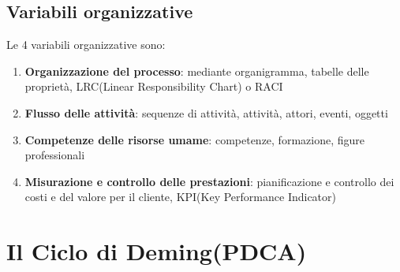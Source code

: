 \subsection{Variabili organizzative}
Le 4 variabili organizzative sono:
\begin{enumerate}
  \item \textbf{Organizzazione del processo}: mediante organigramma, tabelle delle proprietà, LRC(Linear Responsibility Chart) o RACI
  \item \textbf{Flusso delle attività}: sequenze di attività, attività, attori, eventi, oggetti
  \item \textbf{Competenze delle risorse umame}: competenze, formazione, figure professionali
  \item \textbf{Misurazione e controllo delle prestazioni}: pianificazione e controllo dei costi e del valore per il cliente, KPI(Key Performance Indicator)
\end{enumerate}



\section{Il Ciclo di Deming(PDCA)}

